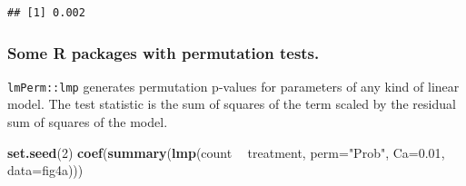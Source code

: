 \documentclass[]{book}
\newenvironment{Shaded}{\begin{snugshade}}{\end{snugshade}}
\newcommand{\CommentTok}[1]{\textcolor[rgb]{0.56,0.35,0.01}{\textit{#1}}}
\newcommand{\ControlFlowTok}[1]{\textcolor[rgb]{0.13,0.29,0.53}{\textbf{#1}}}
\newcommand{\DataTypeTok}[1]{\textcolor[rgb]{0.13,0.29,0.53}{#1}}
\newcommand{\DecValTok}[1]{\textcolor[rgb]{0.00,0.00,0.81}{#1}}
\newcommand{\ErrorTok}[1]{\textcolor[rgb]{0.64,0.00,0.00}{\textbf{#1}}}
\newcommand{\FloatTok}[1]{\textcolor[rgb]{0.00,0.00,0.81}{#1}}
\newcommand{\KeywordTok}[1]{\textcolor[rgb]{0.13,0.29,0.53}{\textbf{#1}}}
\newcommand{\NormalTok}[1]{#1}
\newcommand{\OperatorTok}[1]{\textcolor[rgb]{0.81,0.36,0.00}{\textbf{#1}}}
\newcommand{\StringTok}[1]{\textcolor[rgb]{0.31,0.60,0.02}{#1}}
\begin{document}
\begin{Shaded}
\end{Shaded}

\begin{verbatim}
## [1] 0.002
\end{verbatim}

\hypertarget{some-r-packages-with-permutation-tests.}{%
\subsubsection{Some R packages with permutation tests.}\label{some-r-packages-with-permutation-tests.}}

\texttt{lmPerm::lmp} generates permutation p-values for parameters of any kind of linear model. The test statistic is the sum of squares of the term scaled by the residual sum of squares of the model.

\begin{Shaded}
\begin{Highlighting}[]
\KeywordTok{set.seed}\NormalTok{(}\DecValTok{2}\NormalTok{)}
\KeywordTok{coef}\NormalTok{(}\KeywordTok{summary}\NormalTok{(}\KeywordTok{lmp}\NormalTok{(count }\OperatorTok{~}\StringTok{ }\NormalTok{treatment, }\DataTypeTok{perm=}\StringTok{"Prob"}\NormalTok{, }\DataTypeTok{Ca=}\FloatTok{0.01}\NormalTok{, }
                 \DataTypeTok{data=}\NormalTok{fig4a)))}
\end{Highlighting}
\end{Shaded}
\end{document}
